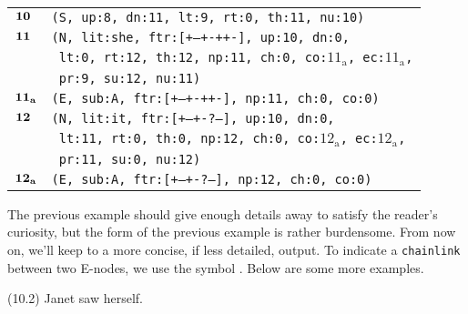 \documentclass{article}
\begin{document}
\begin{minipage}{\textwidth}
{\begin{tabular}{|r|l|}
    ${\textbf{\textrm{10}}_{\phantom{z}}}$ & \texttt{\texttt{(S,~up:8,~dn:11,~lt:9,~rt:0,~th:11,~nu:10)}} \\
    ${\textbf{\textrm{11}}_{\phantom{z}}}$ & \texttt{\texttt{(N,~lit:she,~ftr:[+--+-++-],~up:10,~dn:0,}} \\
    & \texttt{\texttt{~lt:0,~rt:12,~th:12,~np:11,~ch:0,~co:${\textrm{11}_{\textrm{a}}}$,~ec:${\textrm{11}_{\textrm{a}}}$,}} \\
    & \texttt{\texttt{~pr:9,~su:12,~nu:11)}} \\
    ${\textbf{\textrm{11}}_{\textbf{\textrm{a}}}}$ & \texttt{\texttt{(E,~sub:A,~ftr:[+--+-++-],~np:11,~ch:0,~co:0)}} \\
    ${\textbf{\textrm{12}}_{\phantom{z}}}$ & \texttt{\texttt{(N,~lit:it,~ftr:[+--+-?--],~up:10,~dn:0,}} \\
    & \texttt{\texttt{~lt:11,~rt:0,~th:0,~np:12,~ch:0,~co:${\textrm{12}_{\textrm{a}}}$,~ec:${\textrm{12}_{\textrm{a}}}$,}} \\
    & \texttt{\texttt{~pr:11,~su:0,~nu:12)}} \\
    ${\textbf{\textrm{12}}_{\textbf{\textrm{a}}}}$ & \texttt{\texttt{(E,~sub:A,~ftr:[+--+-?--],~np:12,~ch:0,~co:0)}} \\
    \hline
  \end{tabular}
  }
\end{minipage}
\bigbreak


\bigbreak
\begin{minipage}{\textwidth}
The previous example should give enough details away to satisfy
the reader's curiosity, but the form of the previous example is
rather burdensome. From now on, we'll keep to a more concise, if
less detailed, output. To indicate a \texttt{chainlink} between
two E-nodes, we use the symbol \texttt{}.
\bigbreak
Below are some more examples.
\end{minipage}
\bigbreak

\bigbreak
\begin{minipage}{\textwidth}
\begin{enumerate*}
\item[(10.2)] Janet saw herself.
\end{enumerate*}
\bigbreak
\centering
{}
\end{minipage}
\bigbreak
\end{document}
